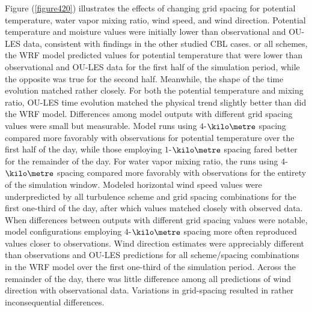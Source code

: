 Figure (\autoref{figure420}) illustrates the effects of changing grid spacing for potential temperature, water vapor mixing ratio, wind speed, and wind direction. Potential temperature and moisture values were initially lower than observational and OU-LES data, consistent with findings in the other studied CBL cases. or all schemes, the WRF model predicted values for potential temperature that were lower than observational and OU-LES data for the first half of the simulation period, while the opposite was true for the second half. Meanwhile, the shape of the time evolution matched rather closely. For both the potential temperature and mixing ratio, OU-LES time evolution matched the physical trend slightly better than did the WRF model. Differences among model outputs with different grid spacing values were small but measurable. Model runs using $4$-$\kilo\metre$ spacing compared more favorably with observations for potential temperature over the first half of the day, while those employing $1$-$\kilo\metre$ spacing fared better for the remainder of the day. For water vapor mixing ratio, the runs using $4$-$\kilo\metre$ spacing compared more favorably with observations for the entirety of the simulation window. Modeled horizontal wind speed values were underpredicted by all turbulence scheme and grid spacing combinations for the first one-third of the day, after which values matched closely with observed data. When differences between outputs with different grid spacing values were notable, model configurations employing $4$-$\kilo\metre$ spacing more often reproduced values closer to observations. Wind direction estimates were appreciably different than observations and OU-LES predictions for all scheme\slash spacing combinations in the WRF model over the first one-third of the simulation period. Across the remainder of the day, there was little difference among all predictions of wind direction with observational data. Variations in grid-spacing resulted in rather inconsequential differences.



